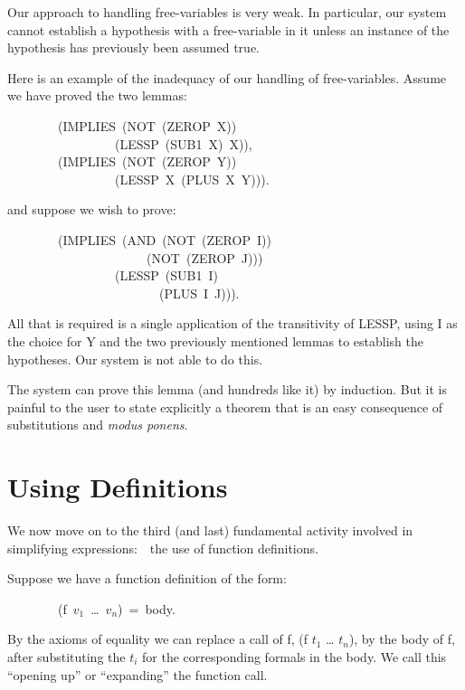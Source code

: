 \documentclass[11pt]{book}
\newenvironment{pubasis}{\begin{flushleft}\ttfamily\small}{\normalsize\rmfamily\end{flushleft}}
\newcommand{\pubinlineunderline}[1]{\emph{#1}}
\newcommand{\pubdefaulttextsize}{\large}
\begin{document}
Our approach to handling free-variables is very weak.  In particular,
our system cannot establish a hypothesis with a free-variable in it unless 
an instance of
the
hypothesis has previously been assumed true.

Here is an example of the inadequacy of our handling of free-variables.
Assume we have proved the two lemmas:
\begin{pubasis}
~~~~~~~~(IMPLIES~(NOT~(ZEROP~X))\\
~~~~~~~~~~~~~~~~~(LESSP~(SUB1~X)~X)),\\

~~~~~~~~(IMPLIES~(NOT~(ZEROP~Y))\\
~~~~~~~~~~~~~~~~~(LESSP~X~(PLUS~X~Y))).\\
\end{pubasis}
and suppose we wish to prove:
\begin{pubasis}
~~~~~~~~(IMPLIES~(AND~(NOT~(ZEROP~I))\\
~~~~~~~~~~~~~~~~~~~~~~(NOT~(ZEROP~J)))\\
~~~~~~~~~~~~~~~~~(LESSP~(SUB1~I)\\
~~~~~~~~~~~~~~~~~~~~~~~~(PLUS~I~J))).\\
\end{pubasis}
All that is required is  a single application of the transitivity of LESSP,
using I as the  choice for Y and the two previously mentioned
lemmas to establish the hypotheses.  Our system is not able to do this.

The system can prove this lemma (and hundreds like it)
by induction.  But it is painful to the
user to state explicitly a theorem that is
an easy consequence of substitutions and \pubinlineunderline{modus ponens}.
\chapter{Using Definitions}
\label{SECDEFINITIONS}
\pubdefaulttextsize
We now move on to the third (and last) fundamental activity involved in
simplifying expressions:~~the use of function definitions.

Suppose we have a function definition of the form:
\begin{pubasis}
~~~~~~~~(f~$v_{1}$~\ldots{}~$v_{n}$)~=~body.\\
\end{pubasis}
By the axioms of equality we can replace a call of f, (f $t_{1}$ \ldots{} $t_{n}$),
by the body of f, after substituting the $t_{i}$ for the corresponding
formals in the body.  We call this ``opening up'' or ``expanding'' the
function call.
\end{document}
